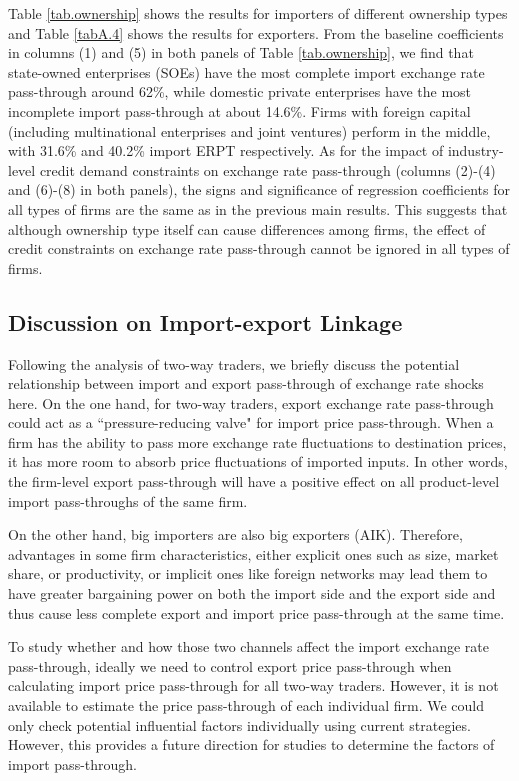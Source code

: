 \documentclass[12pt]{article}
\begin{document}
Table \ref{tab.ownership} shows the results for importers of different ownership types and Table \ref{tabA.4} shows the results for exporters. From the baseline coefficients in columns (1) and (5) in both panels of Table \ref{tab.ownership}, we find that state-owned enterprises (SOEs) have the most complete import exchange rate pass-through around 62\%, while domestic private enterprises have the most incomplete import pass-through at about 14.6\%. Firms with foreign capital (including multinational enterprises and joint ventures) perform in the middle, with 31.6\% and 40.2\% import ERPT respectively. As for the impact of industry-level credit demand constraints on exchange rate pass-through (columns (2)-(4) and (6)-(8) in both panels), the signs and significance of regression coefficients for all types of firms are the same as in the previous main results. This suggests that although ownership type itself can cause differences among firms, the effect of credit constraints on exchange rate pass-through cannot be ignored in all types of firms.

\subsection{Discussion on Import-export Linkage}

Following the analysis of two-way traders, we briefly discuss the potential relationship between import and export pass-through of exchange rate shocks here. On the one hand, for two-way traders, export exchange rate pass-through could act as a ``pressure-reducing valve" for import price pass-through. When a firm has the ability to pass more exchange rate fluctuations to destination prices, it has more room to absorb price fluctuations of imported inputs. In other words, the firm-level export pass-through will have a positive effect on all product-level import pass-throughs of the same firm.

On the other hand, big importers are also big exporters (AIK\cite{aik2014}). Therefore, advantages in some firm characteristics, either explicit ones such as size, market share, or productivity, or implicit ones like foreign networks may lead them to have greater bargaining power on both the import side and the export side and thus cause less complete export and import price pass-through at the same time. 

To study whether and how those two channels affect the import exchange rate pass-through, ideally we need to control export price pass-through when calculating import price pass-through for all two-way traders. However, it is not available to estimate the price pass-through of each individual firm. We could only check potential influential factors individually using current strategies. However, this provides a future direction for studies to determine the factors of import pass-through.
\end{document}
